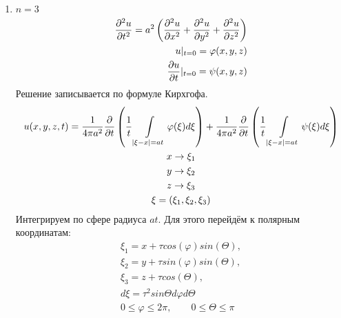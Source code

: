 \documentclass[../main.tex]{subfiles}
\begin{document}
\begin{enumerate}
\item $n=3$
\begin{equation}
    \label{eq:2.7.2}
    \begin{split}
    \frac{\partial ^2u}{\partial t^2} = a^2\left(\frac{\partial ^2u}{\partial x^2}+\frac{\partial ^2u}{\partial y^2}+\frac{\partial ^2u}{\partial z^2}\right)\\
    u|_{t=0} = \varphi(x,y,z)\\
    \frac{\partial u}{\partial t}|_{t=0} = \psi(x,y,z)
    \end{split}
\end{equation}
Решение записывается по формуле Кирхгофа.
\begin{gather*}
    u(x,y,z,t) = \frac{1}{4\pi a^2}\frac{\partial  }{\partial t}\left(
    \frac{1}{t}\int\displaylimits_{|\xi-x|=at} \varphi(\xi)d\xi\right)
    +
    \frac{1}{4\pi a^2}\frac{\partial  }{\partial t}\left(
    \frac{1}{t}\int\displaylimits_{|\xi-x|=at} \psi(\xi)d\xi\right)\\
    x \rightarrow \xi_1\\
    y \rightarrow \xi_2\\
    z \rightarrow \xi_3\\
    \xi = (\xi_1,\xi_2, \xi_3)
\end{gather*}
Интегрируем по сфере радиуса $at$. Для этого перейдём к
полярным координатам:
\begin{gather*}
    \xi_1 = x + \tau cos(\varphi) sin(\varTheta), \\
    \xi_2 = y + \tau sin(\varphi) sin(\varTheta),\\
    \xi_3 = z + \tau cos(\varTheta),\\
    d\xi = \tau^2 sin\varTheta d\varphi d\varTheta \\
    0 \leq \varphi \leq 2\pi, \qquad 0 \leq \varTheta \leq \pi
\end{gather*}
\end{enumerate}
\end{document}
